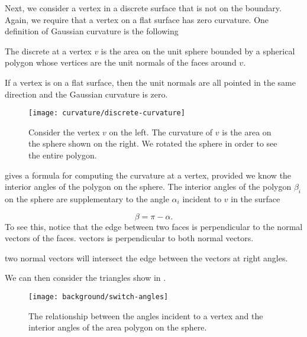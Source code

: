 Next, we consider a vertex in a discrete surface that is not on the boundary.
Again, we require that a vertex on a flat surface has zero curvature.
One definition of Gaussian curvature is the following

\begin{definition}\label{def:discrete-curvature-vertex}

The discrete  at a vertex $v$ is the area on the unit 
sphere bounded by a spherical polygon whose vertices are the unit normals of 
the faces around $v$.

\end{definition}

If a vertex is on a flat surface, then the unit normals are all pointed
in the same direction and the  Gaussian curvature is zero.

\begin{figure}[htb]
\centering
\texttt{[image: curvature/discrete-curvature]}
\caption{Consider the vertex $v$ on the left. The curvature of $v$
is the area on the sphere shown on the right. We rotated the sphere
in order to see the entire polygon.}
\label{fig:discrete-curvature}
\end{figure}


 gives a formula for computing the curvature at a vertex, provided
we know the interior angles of the polygon on the sphere.
The interior angles of the polygon $\beta_i$ on the sphere are supplementary to
the angle $\alpha_i$ incident to $v$ in the surface

\begin{equation} \label{eqn:switcheroo}
\beta=\pi-\alpha.
\end{equation}
To see this, notice that the edge between two faces
is perpendicular to the normal vectors of the faces.
vectors is perpendicular to both normal vectors. 

two normal vectors will intersect the edge between the vectors 
at right angles. 

We can then consider the triangles show in
 .


\begin{figure}[htb]
\centering
\texttt{[image: background/switch-angles]}
\caption{The relationship between the angles incident to a vertex and
the interior angles of the area polygon on the sphere.}
\label{fig:switcheroo}
\end{figure}



